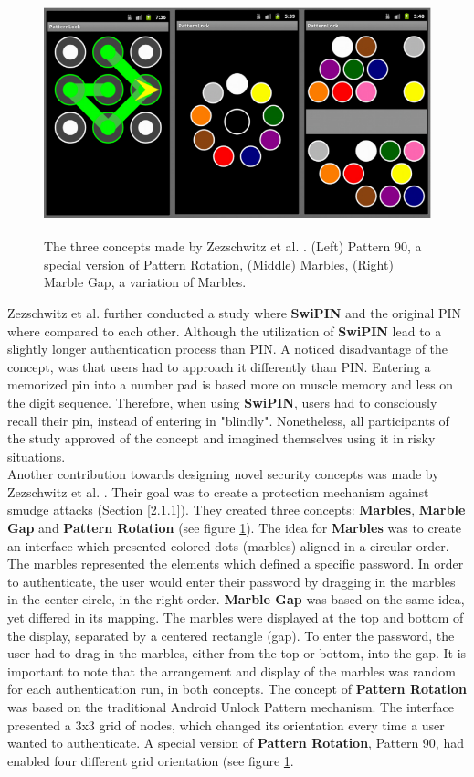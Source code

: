 \begin{figure}[t!]
\centering
\includegraphics[width=13cm, height=7cm]{Chapters/graphics/graphic.PNG}
\caption{The three concepts made by Zezschwitz et al. \cite{Marbles}. (Left) Pattern 90, a special version of Pattern Rotation, (Middle) Marbles, (Right) Marble Gap, a variation of Marbles.}
\label{fig:marbles}
\end{figure}

Zezschwitz et al. \cite{Swipin} further conducted a study where \textbf{SwiPIN} and the original PIN where compared to each other. Although the utilization of \textbf{SwiPIN} lead to a slightly longer authentication process than PIN. A noticed disadvantage of the concept, was that users had to approach it differently than PIN. Entering a memorized pin into a number pad is based more on muscle memory and less on the digit sequence. Therefore, when using \textbf{SwiPIN}, users had to consciously recall their pin, instead of entering in "blindly". Nonetheless, all participants of the study approved of the concept and imagined themselves using it in risky situations. \\

Another contribution towards designing novel security concepts was made by Zezschwitz et al. \cite{Marbles}. Their goal was to create a protection mechanism against smudge attacks (Section \ref{2.1.1}). They created three concepts: \textbf{Marbles}, \textbf{Marble Gap} and \textbf{Pattern Rotation} (see figure \ref{fig:marbles}). The idea for \textbf{Marbles} was to create an interface which presented colored dots (marbles) aligned in a circular order. The marbles represented the elements which defined a specific password. In order to authenticate, the user would enter their password by dragging in the marbles in the center circle, in the right order. \textbf{Marble Gap} was based on the same idea, yet differed in its mapping. The marbles were displayed at the top and bottom of the display, separated by a centered rectangle (gap). To enter the password, the user had to drag in the marbles, either from the top or bottom, into the gap. It is important to note that the arrangement and display of the marbles was random for each authentication run, in both concepts. The concept of \textbf{Pattern Rotation} was based on the traditional Android Unlock Pattern mechanism. The interface presented a 3x3 grid of nodes, which changed its orientation every time a user wanted to authenticate. A special version of \textbf{Pattern Rotation}, Pattern 90, had enabled four different grid orientation (see figure \ref{fig:marbles}. \\

